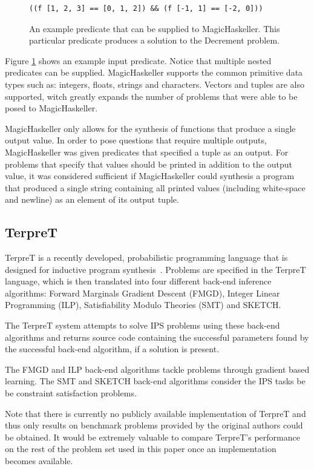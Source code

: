 \begin{figure}
\begin{verbatim}
((f [1, 2, 3] == [0, 1, 2]) && (f [-1, 1] == [-2, 0]))  
\end{verbatim}
\caption{An example predicate that can be supplied to MagicHaskeller. This particular predicate produces a solution to the Decrement problem.}
\label{fig:MHpred}
\end{figure}

Figure \ref{fig:MHpred} shows an example input predicate. Notice that multiple nested predicates can be supplied. MagicHaskeller supports the common primitive data types such as: integers, floats, strings and characters. Vectors and tuples are also supported, witch greatly expands the number of problems that were able to be posed to MagicHaskeller.

MagicHaskeller only allows for the synthesis of functions that produce a single output value. In order to pose questions that require multiple outputs, MagicHaskeller was given predicates that specified a tuple as an output. For problems that specify that values should be printed in addition to the output value, it was considered sufficient if MagicHaskeller could synthesis a program that produced a single string containing all printed values (including white-space and newline) as an element of its output tuple.

\subsection{TerpreT}

TerpreT is a recently developed, probabilistic programming language that is designed for inductive program synthesis~\cite{Gaunt2016}. Problems are specified in the TerpreT language, which is then translated into four different back-end inference algorithms: Forward Marginals Gradient Descent (FMGD), Integer Linear Programming (ILP), Satisfiability Modulo Theories (SMT) and SKETCH.

The TerpreT system attempts to solve IPS problems using these back-end algorithms and returns source code containing the successful parameters found by the successful back-end algorithm, if a solution is present.

The FMGD and ILP back-end algorithms tackle problems through gradient based learning. The SMT and SKETCH back-end algorithms consider the IPS tasks be be  constraint satisfaction problems.

Note that there is currently no publicly available implementation of TerpreT and thus only results on benchmark problems provided by the original authors could be obtained. It would be extremely valuable to compare TerpreT's performance on the rest of the problem set used in this paper once an implementation becomes available.

